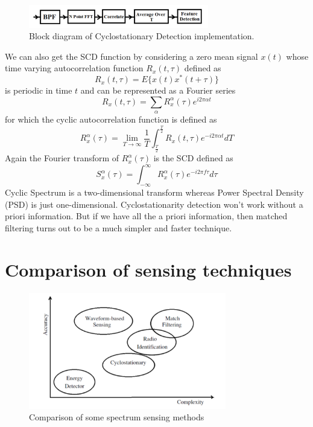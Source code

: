 \begin{figure}
\centering
\includegraphics[width=0.7\textwidth]{../images/csd}
\caption[Cyclostationary Detection implementation]{Block diagram 
of Cyclostationary Detection implementation.}
\label{csd}
\end{figure}

We can also get the SCD function by considering a zero mean signal $x(t)$
whose time varying autocorrelation function $R_x(t,\tau)$ defined as
\cite{prithvi11}
\begin{equation*}
    R_{x}(t,\tau) = E\{x(t)x^{\ast}(t+\tau)\}
\end{equation*}
is periodic in time $t$ and can be represented as a Fourier series
\begin{equation*}
    R_{x}(t,\tau) = \sum_{\alpha}R_{x}^{\alpha} (\tau)e^{i2\pi\alpha t} 
\end{equation*}
for which the cyclic autocorrelation function is defined as
\begin{equation*}
    R_{x}^{\alpha}(\tau) = \lim_{T\rightarrow\infty} {\frac{1}{T}}
    \int_{\frac{T}{2}}^{\frac{T}{2}}R_{x}(t,\tau)e^{-i2\pi\alpha t}dT
\end{equation*}
Again the Fourier transform of $R_{x}^{\alpha}(\tau)$ is the SCD defined as
\begin{equation*}
    S_{x}^{\alpha}(\tau)=\int_{-\infty}^{\infty}R_{x}^{\alpha}
    (\tau)e^{-i2\pi f\tau}d\tau
\end{equation*}
Cyclic Spectrum is a two-dimensional transform whereas Power Spectral Density
(PSD) is just one-dimensional. Cyclostationarity detection won't work without
a priori information. But if we have all the a priori information, then 
matched filtering turns out to be a much simpler and faster technique.

\section{Comparison of sensing techniques}

\begin{figure}
\centering
\includegraphics[width=0.77\textwidth]{../images/compareSensing}
\caption[Comparison of sensing methods]{Comparison of some spectrum sensing 
methods}
\label{compareSensing}
\end{figure}

